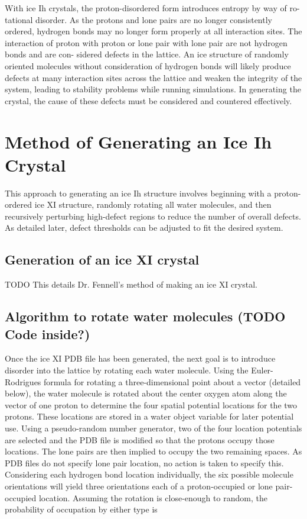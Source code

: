 With ice Ih crystals, the proton-disordered form introduces entropy by way of ro- tational disorder. 
As the protons and lone pairs are no longer consistently ordered, hydrogen bonds may no longer form properly at all interaction sites. 
The interaction of proton with proton or lone pair with lone pair are not hydrogen bonds and are con- sidered defects in the lattice. 
An ice structure of randomly oriented molecules without consideration of hydrogen bonds will likely produce defects at many interaction sites across the lattice and weaken the integrity of the system, leading to stability problems while running simulations. 
In generating the crystal, the cause of these defects must be considered and countered effectively.

\section{Method of Generating an Ice Ih Crystal}
This approach to generating an ice Ih structure involves beginning with a proton- ordered ice XI structure, randomly rotating all water molecules, and then recursively perturbing high-defect regions to reduce the number of overall defects. 
As detailed later, defect thresholds can be adjusted to fit the desired system.
\subsection{Generation of an ice XI crystal}
TODO
This details Dr. Fennell’s method of making an ice XI crystal.
\subsection{Algorithm to rotate water molecules (TODO Code inside?)}
Once the ice XI PDB file has been generated, the next goal is to introduce disorder into the lattice by rotating each water molecule. 
Using the Euler-Rodrigues formula for rotating a three-dimensional point about a vector (detailed below), the water molecule is rotated about the center oxygen atom along the vector of one proton to determine the four spatial potential locations for the two protons. 
These locations are stored in a water object variable for later potential use.
Using a pseudo-random number generator, two of the four location potentials are selected and the PDB file is modified so that the protons occupy those locations. 
The lone pairs are then implied to occupy the two remaining spaces. 
As PDB files do not specify lone pair location, no action is taken to specify this. 
Considering each hydrogen bond location individually, the six possible molecule orientations will yield three orientations each of a proton-occupied or lone pair-occupied location. 
Assuming the rotation is close-enough to random, the probability of occupation by either type is 

